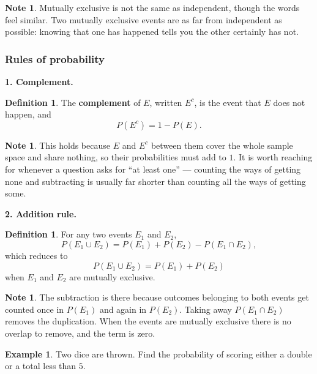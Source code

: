 \documentclass[11pt,a4paper]{article}
\theoremstyle{definition}
\newtheorem{definition}[thm]{Definition}
\newtheorem{example}[thm]{Example}
\newtheorem{note}[thm]{Note}
\begin{document}
\begin{note}
Mutually exclusive is not the same as independent, though the words feel similar. Two
mutually exclusive events are as far from independent as possible: knowing that one has
happened tells you the other certainly has not.
\end{note}

\subsubsection{Rules of probability}

\textbf{1. Complement.}

\begin{definition}
The \textbf{complement} of $E$, written $E^c$, is the event that $E$ does not happen,
and
$$P\left(E^c\right)=1-P(E).$$
\end{definition}

\begin{note}
This holds because $E$ and $E^c$ between them cover the whole sample space and share
nothing, so their probabilities must add to $1$. It is worth reaching for whenever a
question asks for ``at least one'' --- counting the ways of getting none and subtracting
is usually far shorter than counting all the ways of getting some.
\end{note}

\textbf{2. Addition rule.}

\begin{definition}
For any two events $E_1$ and $E_2$,
$$P\left(E_1\cup E_2\right)=P\left(E_1\right)+P\left(E_2\right)-P\left(E_1\cap E_2\right),$$
which reduces to
$$P\left(E_1\cup E_2\right)=P\left(E_1\right)+P\left(E_2\right)$$
when $E_1$ and $E_2$ are mutually exclusive.
\end{definition}

\begin{note}
The subtraction is there because outcomes belonging to both events get counted once in
$P(E_1)$ and again in $P(E_2)$. Taking away $P(E_1\cap E_2)$ removes the duplication.
When the events are mutually exclusive there is no overlap to remove, and the term is
zero.
\end{note}

\begin{example}
Two dice are thrown. Find the probability of scoring either a double or a total less
than $5$.
\end{example}
\end{document}

